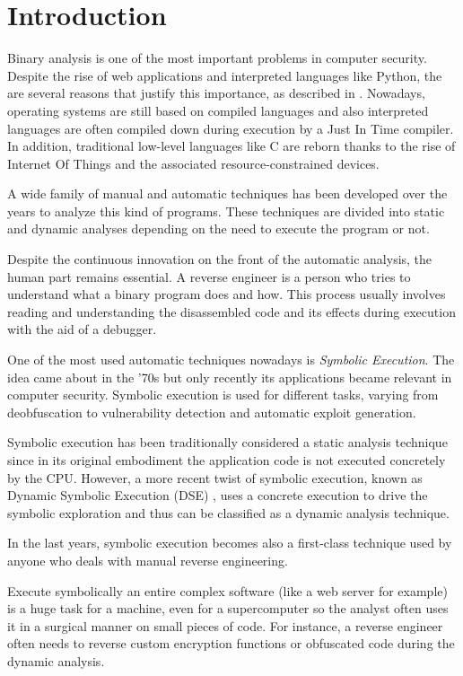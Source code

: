 \chapter{Introduction}

Binary analysis is one of the most important problems in computer security.
Despite the rise of web applications and interpreted languages like Python, the are several reasons that justify this importance, as described in \cite{shoshitaishvili2016state}.
Nowadays, operating systems are still based on compiled languages and also interpreted languages are often compiled down during execution by a Just In Time compiler. In addition, traditional low-level languages like C are reborn thanks to the rise of Internet Of Things and the associated resource-constrained devices.

A wide family of manual and automatic techniques has been developed over the years to analyze this kind of programs.
These techniques are divided into static and dynamic analyses depending on the need to execute the program or not.

Despite the continuous innovation on the front of the automatic analysis, the human part remains essential.
A reverse engineer is a person who tries to understand what a binary program does and how.
This process usually involves reading and understanding the disassembled code and its effects during execution with the aid of a debugger.

One of the most used automatic techniques nowadays is {\em Symbolic Execution}.
The idea came about in the '70s \cite{King} but only recently its applications became relevant in computer security.
Symbolic execution is used for different tasks, varying from deobfuscation to vulnerability detection and automatic exploit generation.

Symbolic execution has been traditionally considered a static analysis technique since in its original embodiment the application code is not executed concretely by the CPU. However, a more recent twist of symbolic execution, known as Dynamic Symbolic Execution (DSE) \cite{DART}, uses a concrete execution to drive the symbolic exploration and thus can be classified as a dynamic analysis technique.

In the last years, symbolic execution becomes also a first-class technique used by anyone who deals with manual reverse engineering.


Execute symbolically an entire complex software (like a web server for example) is a huge task for a machine, even for a supercomputer so the analyst often uses it in a surgical manner on small pieces of code.
For instance, a reverse engineer often needs to reverse custom encryption functions or obfuscated code during the dynamic analysis.

